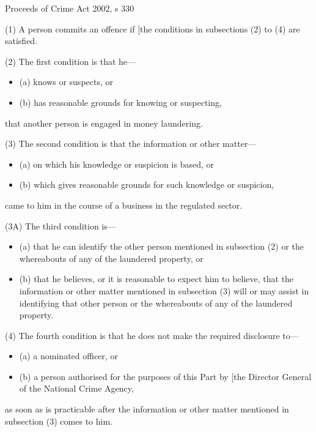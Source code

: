 \documentclass[
]{article}
\newenvironment{env-28b706cc-8a08-422f-af86-ede86c79505b}
{
    \savenotes\tcolorbox[blanker,breakable,left=5pt,borderline west={2pt}{-4pt}{green}]
}
{
    \endtcolorbox\spewnotes
}
\begin{document}
\begin{env-28b706cc-8a08-422f-af86-ede86c79505b}

Proceeds of Crime Act 2002, s 330

(1) A person commits an offence if {[}the conditions in subsections (2)
to (4) are satisfied.

(2) The first condition is that he---

\begin{itemize}
\item
  (a) knows or suspects, or
\item
  (b) has reasonable grounds for knowing or suspecting,
\end{itemize}

that another person is engaged in money laundering.

(3) The second condition is that the information or other matter---

\begin{itemize}
\item
  (a) on which his knowledge or suspicion is based, or
\item
  (b) which gives reasonable grounds for such knowledge or suspicion,
\end{itemize}

came to him in the course of a business in the regulated sector.

(3A) The third condition is---

\begin{itemize}
\item
  (a) that he can identify the other person mentioned in subsection (2)
  or the whereabouts of any of the laundered property, or
\item
  (b) that he believes, or it is reasonable to expect him to believe,
  that the information or other matter mentioned in subsection (3) will
  or may assist in identifying that other person or the whereabouts of
  any of the laundered property.
\end{itemize}

(4) The fourth condition is that he does not make the required
disclosure to---

\begin{itemize}
\item
  (a) a nominated officer, or
\item
  (b) a person authorised for the purposes of this Part by {[}the
  Director General of the National Crime Agency,
\end{itemize}

as soon as is practicable after the information or other matter
mentioned in subsection (3) comes to him.

\end{env-28b706cc-8a08-422f-af86-ede86c79505b}
\end{document}
